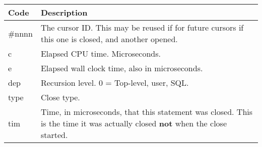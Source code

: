 \begin{longtable}[]{@{}l|l@{}}
\toprule
\begin{minipage}[b]{0.14\columnwidth}\raggedright\strut
Code\strut
\end{minipage} & \begin{minipage}[b]{0.65\columnwidth}\raggedright\strut
Description\strut
\end{minipage}\tabularnewline
\midrule
\endhead
\begin{minipage}[t]{0.14\columnwidth}\raggedright\strut
\#nnnn\strut
\end{minipage} & \begin{minipage}[t]{0.65\columnwidth}\raggedright\strut
The cursor ID. This may be reused if for future cursors if this one is
closed, and another opened.\strut
\end{minipage}\tabularnewline
\begin{minipage}[t]{0.14\columnwidth}\raggedright\strut
c\strut
\end{minipage} & \begin{minipage}[t]{0.65\columnwidth}\raggedright\strut
Elapsed CPU time. Microseconds.\strut
\end{minipage}\tabularnewline
\begin{minipage}[t]{0.14\columnwidth}\raggedright\strut
e\strut
\end{minipage} & \begin{minipage}[t]{0.65\columnwidth}\raggedright\strut
Elapsed wall clock time, also in microseconds.\strut
\end{minipage}\tabularnewline
\begin{minipage}[t]{0.14\columnwidth}\raggedright\strut
dep\strut
\end{minipage} & \begin{minipage}[t]{0.65\columnwidth}\raggedright\strut
Recursion level. 0 = Top-level, user, SQL.\strut
\end{minipage}\tabularnewline
\begin{minipage}[t]{0.14\columnwidth}\raggedright\strut
type\strut
\end{minipage} & \begin{minipage}[t]{0.65\columnwidth}\raggedright\strut
Close type.\strut
\end{minipage}\tabularnewline
\begin{minipage}[t]{0.14\columnwidth}\raggedright\strut
tim\strut
\end{minipage} & \begin{minipage}[t]{0.65\columnwidth}\raggedright\strut
Time, in microseconds, that this statement was closed. This is the time
it was actually closed \textbf{not} when the close started.\strut
\end{minipage}\tabularnewline
\bottomrule
\end{longtable}


